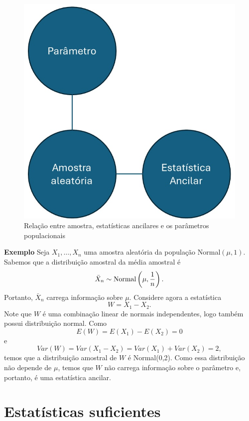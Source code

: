 \documentclass[
  letterpaper,
  DIV=11,
  numbers=noendperiod]{scrartcl}
\begin{document}
\begin{figure}

{\centering \includegraphics{fig_stat_ancilar.jpg}

}

\caption{Relação entre amostra, estatísticas ancilares e os parâmetros
populacionais}

\end{figure}%

\textbf{Exemplo} Seja \(X_1,\ldots,X_{n}\) uma amostra aleatória da
população Normal\((\mu,1)\). Sabemos que a distribuição amostral da
média amostral é
\[\bar{X}_n\sim\hbox{Normal}\left(\mu,\frac{1}{n}\right).\] Portanto,
\(\bar{X}_n\) carrega informação sobre \(\mu\). Considere agora a
estatística \[W=X_1-X_2.\] Note que \(W\) é uma combinação linear de
normais independentes, logo também possui distribuição normal. Como
\[E(W)=E(X_1)-E(X_2)=0\] e \[Var(W)=Var(X_1-X_2)=Var(X_1)+Var(X_2)=2,\]
temos que a distribuição amostral de \(W\) é Normal(0,2). Como essa
distribuição não depende de \(\mu\), temos que \(W\) não carrega
informação sobre o parâmetro e, portanto, é uma estatística ancilar.

\section{Estatísticas suficientes}\label{estatuxedsticas-suficientes}
\end{document}
